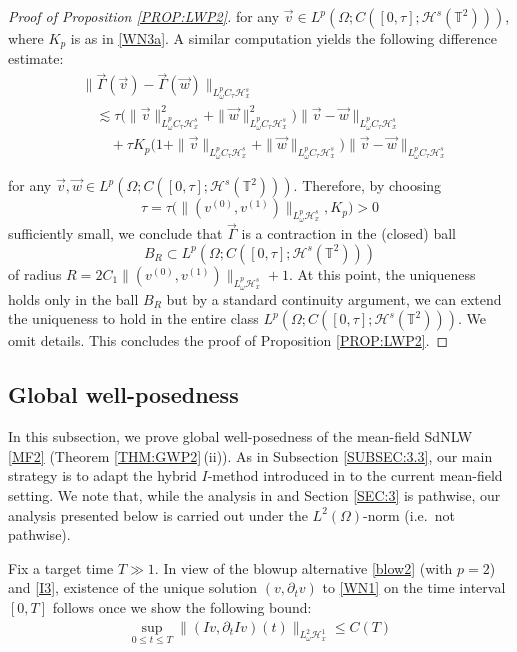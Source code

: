 \documentclass[letterpaper, 11pt,  reqno]{amsart}
\newcommand{\1}{\hspace{0.5mm}\text{I}\hspace{0.2mm}}
\newcommand{\noi}{\noindent}
\newcommand{\T}{\mathbb{T}}
\renewcommand{\H}{\mathcal{H}}
\newcommand{\dt}{\partial_t}
\newcommand{\les}{\lesssim}
\newcommand{\G}{\Gamma}
\renewcommand{\O}{\Omega}
\renewcommand{\o}{\omega}
\numberwithin{equation}{section}
\numberwithin{theorem}{section}
\begin{document}
\begin{proof}[Proof of Proposition \ref{PROP:LWP2}]
\noi
for any $\vec v \in L^p(\O; C([0, \tau]; \H^s(\T^2)))$,
where $K_p$
is as in \eqref{WN3a}.
A similar computation yields the following difference estimate:
\begin{align*}
& \|\vec\G( \vec v) - \vec \G (\vec w)\|_{L^p_\o C_\tau \H^s_x}\\
& \quad 
\les 
  \tau
\Big(  \| \vec v\|_{L^p_\o C_\tau \H^s_x}^2
+ \| \vec w\|_{L^p_\o C_\tau \H^s_x}^2
\Big)\|  \vec v  - \vec w\|_{L^p_\o C_\tau \H^s_x}\\
& \quad \quad + 
\tau K_p 
\Big( 1  + \| \vec v\|_{L^p_\o C_\tau \H^s_x}
+ \| \vec w\|_{L^p_\o C_\tau \H^s_x}
\Big)
 \|  \vec v  - \vec w\|_{L^p_\o C_\tau \H^s_x}
\end{align*}



\noi
\noi
for any $\vec v, \vec w \in L^p(\O; C([0, \tau]; \H^s(\T^2)))$.
Therefore, 
by choosing
\[
\tau = \tau \big(\| (v^{(0)}, v^{(1)}) \|_{L^p_\o \H^s_x}, 
K_p\big) >0\] sufficiently small, 
we conclude that $\vec \G$ is a contraction in the 
(closed) ball 
\[B_R \subset L^p(\O; C([0, \tau]; \H^s(\T^2)))\] of radius
$R = 2C_1
\| (v^{(0)}, v^{(1)}) \|_{L^p_\o \H^s_x} + 1$.
At this point, the uniqueness holds only in the ball $B_R$
but by a standard continuity argument, 
we can extend the uniqueness to hold
in the entire class $L^p(\O; C([0, \tau]; \H^s(\T^2)))$.
We omit details. 
This concludes the proof of Proposition \ref{PROP:LWP2}.
\end{proof}








\subsection{Global well-posedness} 
\label{SUBSEC:4.2}


In this subsection, 
we prove global well-posedness of the mean-field SdNLW
\eqref{MF2} (Theorem \ref{THM:GWP2}\,(ii)).
As in Subsection \ref{SUBSEC:3.3}, 
our main strategy  is to adapt  the 
hybrid $I$-method
introduced in \cite{GKOT}
to the current mean-field setting.
We note that, while the analysis in \cite{GKOT}
and Section \ref{SEC:3}
is pathwise, 
our analysis presented below
is carried out under the $L^2(\O)$-norm (i.e.~not pathwise).



Fix a target time $T \gg1$.
In view of 
the blowup alternative \eqref{blow2} (with $p = 2$)
and 
\eqref{I3}, 
existence of the unique solution $(v, \dt v)$ to  \eqref{WN1} on 
the time interval $[0, T]$
follows once we show the following bound:
\begin{align*}
\sup_{0 \le t \le T}
\| (I v , \dt I v ) (t)\|_{ L^2_\o \H^1_x} \le C(T) 
\end{align*}
\end{document}
